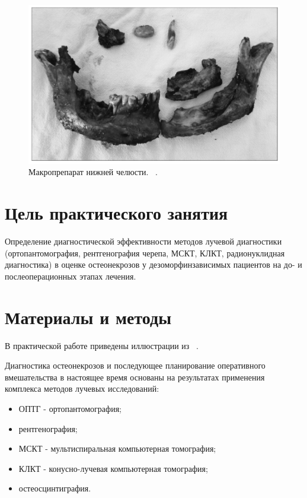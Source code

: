 \documentclass[11pt]{article}
\begin{document}
	\begin{figure}[H]
		\centering
		\includegraphics[width=\textwidth]{nch}
		\caption{Макропрепарат нижней челюсти. ~\cite{rsj}.}
		\label{fig:nch}
	\end{figure}
	
	
	\section{Цель практического занятия}
	Определение диагностической эффективности методов лучевой диагностики  (ортопантомография, рентгенография черепа, МСКТ, КЛКТ, радионуклидная диагностика) в оценке остеонекрозов у дезоморфинзависимых пациентов на 
	до- и послеоперационных этапах лечения.
		
	\section{Материалы и методы}
	В практической работе приведены иллюстрации из ~\cite{rsj, rejr}. 
	
	Диагностика остеонекрозов и последующее планирование оперативного вмешательства	в настоящее время основаны на результатах	применения комплекса методов лучевых исследований:
	\begin{itemize} 
		\item ОПТГ - ортопантомография;
		\item рентгенография;
		\item МСКТ - мультиспиральная компьютерная томография;
		\item КЛКТ - конусно-лучевая компьютерная томография;
		\item остеосцинтиграфия.
	\end{itemize} 
	
\end{document}
